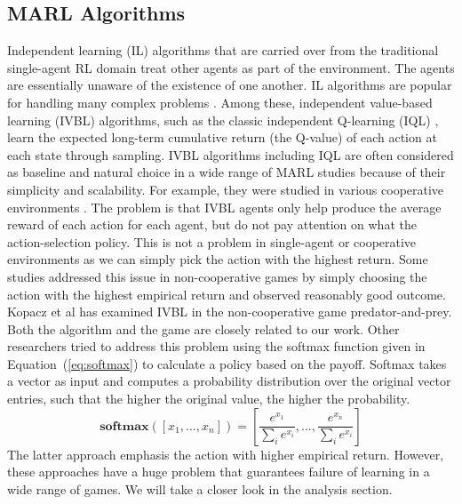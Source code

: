 \documentclass[]{interact}
\theoremstyle{plain}%
\theoremstyle{definition}
\theoremstyle{remark}
\begin{document}
\subsection{MARL Algorithms}
Independent learning (IL) algorithms that are carried over from the traditional single-agent RL domain treat other agents as part of the environment. The agents are essentially unaware of the existence of one another. IL algorithms are popular for handling many complex problems \cite{papoudakis2020benchmarking, gupta2017cooperative, de2020independent, palmer2020independent}. Among these, independent value-based learning (IVBL) algorithms, such as the classic independent Q-learning (IQL) \cite{tan1993multi}, learn the expected long-term cumulative return (the Q-value) of each action at each state through sampling. IVBL algorithms including IQL are often considered as baseline and natural choice in a wide range of MARL studies because of their simplicity and scalability. For example, they were studied in various cooperative environments \cite{foerster2017stabilising, omidshafiei2017deep, palmer2017lenient, palmer2018negative}. The problem is that IVBL agents only help produce the average reward of each action for each agent, but do not pay attention on what the action-selection policy. This is not a problem in single-agent or cooperative environments as we can simply pick the action with the highest return. Some studies addressed this issue in non-cooperative games by simply choosing the action with the highest empirical return \cite{bjornsson2009cadiaplayer, jiang2018q, kopacz2023evaluating} and observed reasonably good outcome. Kopacz et al \cite{kopacz2023evaluating} has examined IVBL in the non-cooperative game predator-and-prey. Both the algorithm and the game are closely related to our work. Other researchers \cite{qu2020distributed} tried to address this problem using the softmax function given in Equation~(\ref{eq:softmax}) to calculate a policy based on the payoff. Softmax takes a vector as input and computes a probability distribution over the original vector entries, such that the higher the original value, the higher the probability.
\begin{equation}
    \textbf{softmax}([x_1, ..., x_n]) = [\frac{e^{x_1}}{\sum_{i}{e^{x_i}}}, ..., \frac{e^{x_n}}{\sum_{i}{e^{x_i}}}]
    \label{eq:softmax}
\end{equation}
The latter approach emphasis the action with higher empirical return. However, these approaches have a huge problem that guarantees failure of learning in a wide range of games. We will take a closer look in the analysis section.
\end{document}
